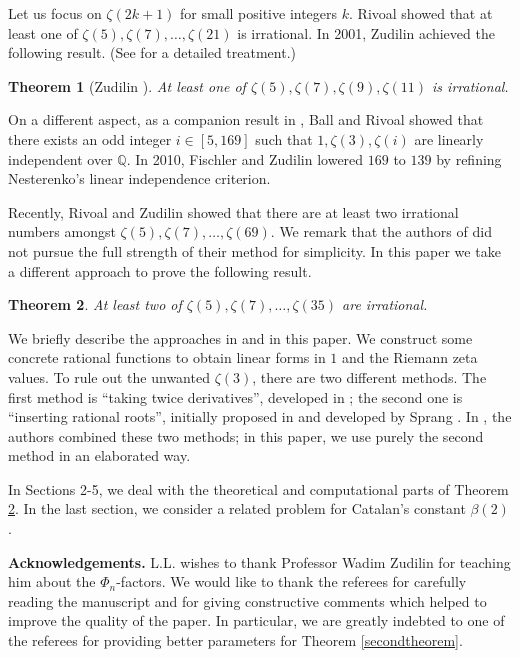 \documentclass[11pt]{amsart}
\newtheorem{theorem}{Theorem}[section]
\numberwithin{equation}{section}
\begin{document}
Let us focus on $\zeta(2k+1)$ for small positive integers $k$. Rivoal \cite{Ri02} showed that at least one of $\zeta(5),\zeta(7),\ldots,\zeta(21)$ is irrational. In 2001, Zudilin achieved the following result. (See \cite{Zu04} for a detailed treatment.)
\begin{theorem}[Zudilin \cite{Zu01}]
At least one of $\zeta(5),\zeta(7),\zeta(9),\zeta(11)$ is irrational.
\end{theorem}
On a different aspect, as a companion result in \cite{BR01}, Ball and Rivoal showed that there exists an odd integer $i \in [5,169]$ such that $1,\zeta(3),\zeta(i)$ are linearly independent over $\mathbb{Q}$. In 2010, Fischler and Zudilin \cite{FZ10} lowered $169$ to $139$ by refining Nesterenko's linear independence criterion.

Recently, Rivoal and Zudilin \cite{RZ20} showed that there are at least two irrational numbers amongst $\zeta(5),\zeta(7),\ldots,\zeta(69)$.  We remark that the authors of \cite{RZ20} did not pursue the full strength of their method for simplicity. In this paper we take a different approach to prove the following result.

\begin{theorem}\label{maintheorem}
At least two of $\zeta(5),\zeta(7),\ldots,\zeta(35)$ are irrational.
\end{theorem}

We briefly describe the approaches in \cite{RZ20} and in this paper. We construct some concrete rational functions to obtain linear forms in $1$ and the Riemann zeta values. To rule out the unwanted $\zeta(3)$, there are two different methods. The first method is ``taking twice derivatives'', developed in \cite{Ri02,Zu01}; the second one is ``inserting rational roots'', initially proposed in \cite{Zu18} and developed by Sprang \cite{Sp18}. In \cite{RZ20}, the authors combined these two methods; in this paper, we use purely the second method in an elaborated way.

In Sections 2-5, we deal with the theoretical and computational parts of Theorem \ref{maintheorem}. In the last section, we consider a related problem for Catalan's constant $\beta(2)$.

\bigskip

\noindent\textbf{Acknowledgements.} L.L. wishes to thank Professor Wadim Zudilin for teaching him about the $\Phi_n$-factors. We would like to thank the referees for carefully reading the manuscript and for giving constructive comments which helped to improve the quality of the paper. In particular, we are greatly indebted to one of the referees for providing better parameters for Theorem \ref{secondtheorem}.
\end{document}
